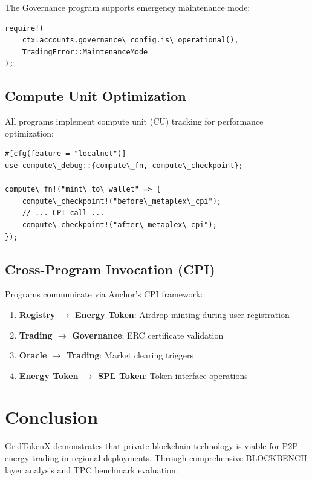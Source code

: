\documentclass[conference]{IEEEtran}
\begin{document}
{The Governance program supports emergency maintenance mode:

\begin{lstlisting}[caption={Maintenance Mode Check}]
require!(
    ctx.accounts.governance\_config.is\_operational(), 
    TradingError::MaintenanceMode
);
\end{lstlisting}

\subsection{Compute Unit Optimization}

All programs implement compute unit (CU) tracking for performance optimization:

\begin{lstlisting}[caption={CU Tracking Macros}]
#[cfg(feature = "localnet")]
use compute\_debug::{compute\_fn, compute\_checkpoint};

compute\_fn!("mint\_to\_wallet" => {
    compute\_checkpoint!("before\_metaplex\_cpi");
    // ... CPI call ...
    compute\_checkpoint!("after\_metaplex\_cpi");
});
\end{lstlisting}

\subsection{Cross-Program Invocation (CPI)}

Programs communicate via Anchor's CPI framework:

\begin{enumerate}
    \item \textbf{Registry $\rightarrow$ Energy Token}: Airdrop minting during user registration
    \item \textbf{Trading $\rightarrow$ Governance}: ERC certificate validation
    \item \textbf{Oracle $\rightarrow$ Trading}: Market clearing triggers
    \item \textbf{Energy Token $\rightarrow$ SPL Token}: Token interface operations
\end{enumerate}

\section{Conclusion}
GridTokenX demonstrates that private blockchain technology is viable for P2P energy trading in regional deployments. Through comprehensive BLOCKBENCH layer analysis and TPC benchmark evaluation:

}
\end{document}
